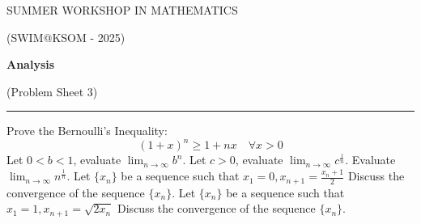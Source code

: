 \documentclass[fleqn]{exam}
\begin{document}
\begin{center}
	{\huge SUMMER WORKSHOP IN MATHEMATICS}
	
	\bigskip
	
	{\large (SWIM@KSOM - 2025)}
	
	\bigskip


	\textbf{\Large Analysis}
	
	\medskip

	{\large (Problem Sheet 3)}

	\medskip
	
	\hrule
\end{center}


\begin{questions}
	\question Prove the Bernoulli's Inequality:
	\[(1+x)^n\geq 1+nx\quad\forall x>0\]
	\question Let $0<b<1$, evaluate $\lim_{n\to\infty}b^n$.
	\question Let $c>0$, evaluate $\lim_{n\to\infty}c^\frac{1}{n}$.
	\question Evaluate $\lim_{n\to\infty}n^\frac{1}{n}$.
	\question Let $\{x_n\}$ be a sequence such that $x_1=0,x_{n+1}=\frac{x_n+1}{2}$ Discuss the convergence of the sequence $\{x_n\}$. 
	\question Let $\{x_n\}$ be a sequence such that $x_1=1,x_{n+1}=\sqrt{2x_n}$ Discuss the convergence of the sequence $\{x_n\}$. 
\end{questions}
\end{document}
